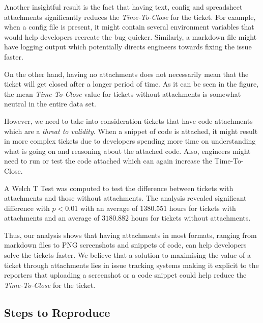 \documentclass{mpaper}
\begin{document}
Another insightful result is the fact that having text, config and spreadsheet attachments significantly 
reduces the \emph{Time-To-Close} for the ticket. For example, when a config file is present, it might contain 
several environment variables that would help developers recreate the bug quicker. Similarly, a markdown file 
might have logging output which potentially directs engineers towards fixing the issue faster.

On the other hand, having no attachments does not necessarily mean that the ticket will get closed after 
a longer period of time. As it can be seen in the figure, the mean \emph{Time-To-Close} value for tickets without 
attachments is somewhat neutral in the entire data set.

However, we need to take into consideration tickets that have code attachments which are a \emph{threat to validity}. 
When a snippet of code is attached, it might result in more complex tickets due to developers spending more time on 
understanding what is going on and reasoning about the attached code. Also, engineers might need to run or test 
the code attached which can again increase the Time-To-Close.

A Welch T Test was computed to test the difference between tickets with attachments and those 
without attachments. The analysis revealed significant difference with $p < 0.01$ with an
average of $1380.551$ hours for tickets with attachments and an average of $3180.882$ hours
for tickets without attachments. 

Thus, our analysis shows that having attachments in most formats, ranging from markdown files to PNG screenshots 
and snippets of code, can help developers solve the tickets faster. We believe that a solution to maximising the value 
of a ticket through attachments lies in issue tracking systems making it explicit to the reporters that uploading a screenshot 
or a code snippet could help reduce the \emph{Time-To-Close} for the ticket.

\vskip18pt

\subsection{Steps to Reproduce}
\end{document}
